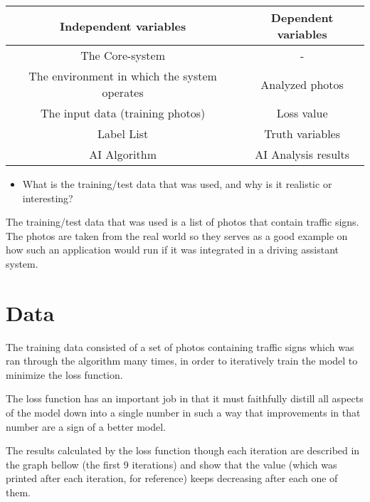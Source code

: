 \documentclass[runningheads,a4paper,11pt]{report}
\begin{document}
\begin{center}
 \begin{tabular}{||c | c||} 
 \hline
 Independent variables & Dependent variables \\ [0.5ex] 
 \hline\hline
 The Core-system & - \\ 
 \hline
 The environment in which the system operates & Analyzed photos \\
 \hline
 The input data (training photos) & Loss value \\
 \hline
 Label List & Truth variables \\
 \hline
 AI Algorithm & AI Analysis results \\ [1ex] 
 \hline
\end{tabular}
\end{center}

\begin{itemize}
	\item What is the training/test data that was used, and why is it realistic or interesting?
\end{itemize}
The training/test data that was used is a list of photos that contain traffic signs. The photos are taken from the real world so they serves as a good example on how such an application would run if it was integrated in a driving assistant system.


\section{Data}
\label{section:data}

The training data consisted of a set of photos containing traffic signs which was ran through the algorithm many times, in order to iteratively train the model to minimize the loss function.

The loss function has an important job in that it must faithfully distill all aspects of the model down into a single number in such a way that improvements in that number are a sign of a better model. 

The results calculated by the loss function though each iteration are described in the graph bellow (the first 9 iterations) and show that the value (which was printed after each iteration, for reference) keeps decreasing after each one of them.

\begin{figure}[H]

\end{figure}
\end{document}
